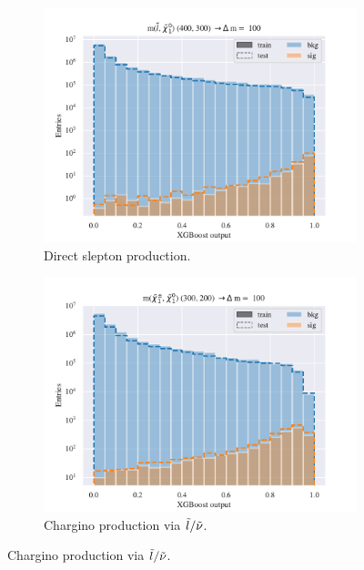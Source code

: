 \begin{figure}[H]
    \centering
    \begin{subfigure}[t!]{0.49\textwidth}
        \includegraphics[width = \textwidth]{Figures/SlepSlep/ML/BDT/All_level/Low/scaled_train_test_395984.pdf}
        \caption{Direct slepton production.}
        \label{fig:SlepslepLow}
    \end{subfigure}
    \begin{subfigure}[t!]{0.49\textwidth}
        \includegraphics[width = \textwidth]{Figures/SlepSnu/BDT/All_level/Low/scaled_train_test_397115.pdf}
        \caption{Chargino production via $\Tilde{l}/\Tilde{\nu}$.}
        \label{fig:SlepsnuLow}
    \end{subfigure}

\end{figure}
